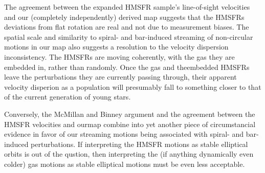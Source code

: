 The agreement between the expanded HMSFR sample's line-of-sight velocities and our (completely independently) derived map suggests that the HMSFRs deviations from flat rotation are real and not due to measurement biases.
The spatial scale and similarity to spiral- and bar-induced streaming of non-circular motions in our map also suggests a resolution to the velocity dispersion inconsistency. The HMSFRs are moving coherently, with the gas they are embedded in, rather than randomly. Once the gas and theembedded HMSFRs leave the perturbations they are currently passing through, their apparent velocity disperion as a population will presumably fall to something closer to that of the current generation of young stars.

Conversely, the McMillan and Binney argument and the agreement between the HMSFR velocities and ourmap combine into yet another piece of circumstancial evidence in favor of our streaming motions being associated with spiral- and bar-induced perturbations. 
If interpreting the HMSFR motions as stable elliptical orbits is out of the qustion, then interpreting the (if anything dynamically even colder) gas motions as stable elliptical motions must be even less acceptable.
